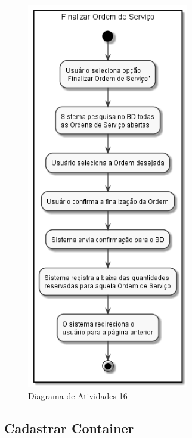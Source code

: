 \documentclass[rascunho,xindy,acronym,symbols]{fei}
\begin{document}
\begin{figure}[H]
    \centering
    \includegraphics[scale=0.6, width=200pt]{./Images/Finalizar_Ordem_de_Servico.png}
    \caption{Diagrama de Atividades 16}
    \label{fig:diag_atv16}
\end{figure}


\subsection{Cadastrar Container}
\end{document}
